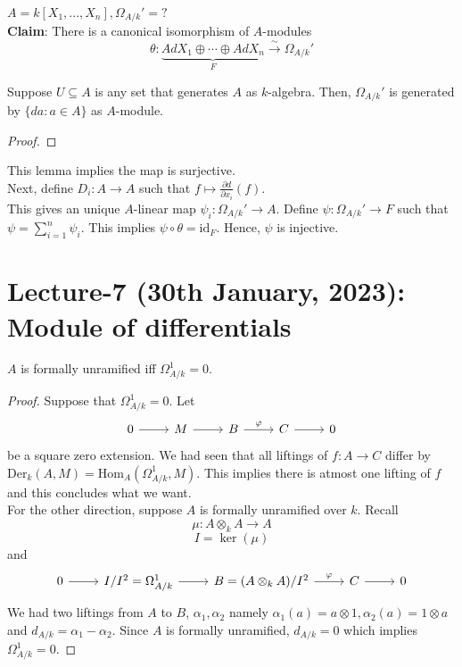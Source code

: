 \documentclass[oneside, 12pt, ]{scrbook}
\newcommand{\Hom}{\mathrm{Hom}}
\newcommand{\ds}{\displaystyle}
\theoremstyle{theorem}
\begin{document}
\begin{exercise}
$A= k[X_{1}, \hdots , X_{n}], \Omega_{A/k}' = ?$ \\
\textbf{Claim}: There is a canonical isomorphism of $A$-modules $$\theta : \underbrace{AdX_{1} \oplus \cdots \oplus AdX_{n}}_{F} \xrightarrow{\sim} \Omega_{A/k}'$$ 
\begin{lemma}
Suppose $U \subseteq A$ is any set that generates $A$ as $k$-algebra. Then, $\Omega_{A/k}'$ is generated by $\{da: a\in A\}$ as $A$-module. 
\end{lemma}
\begin{proof}

\end{proof}
This lemma implies the map is surjective. \\
Next, define $D_{i}: A \rightarrow A$ such that $f \mapsto \ds{\frac{\partial d}{\partial x_{i}}(f)}$. \\
This gives an unique $A$-linear map $\psi_{i}: \Omega_{A/k}' \rightarrow A$. Define $\psi: \Omega_{A/k}' \rightarrow F$ such that $\psi = \sum_{i=1}^n \psi_{i}$. This implies $\psi \circ \theta = \mathrm{id}_{F}$. Hence, $\psi$ is injective. 
\end{exercise}


\chapter{Lecture-7 (30th January, 2023): Module of differentials}

\begin{lemma}
$A$ is formally unramified iff $\Omega_{A/k}^{1} = 0$.
\end{lemma}

\begin{proof}
Suppose that $\Omega_{A/k}^{1} =0$. Let 
\[\begin{tikzcd}
	0 & M & B & C & 0
	\arrow[from=1-1, to=1-2]
	\arrow[from=1-2, to=1-3]
	\arrow["\varphi", from=1-3, to=1-4]
	\arrow[from=1-4, to=1-5]
\end{tikzcd}\] be a square zero extension. We had seen that all liftings of $f: A \rightarrow C$ differ by $\mathrm{Der}_{k}(A,M) = \Hom_{A}(\Omega_{A/k}^{1}, M)$. This implies there is atmost one lifting of $f$ and this concludes what we want. \\

For the other direction, suppose $A$ is formally unramified over $k$. Recall $$\mu: A \otimes_{k} A \rightarrow A$$ $$I = \ker(\mu)$$ and 
\[\begin{tikzcd}
	0 & I/I^2 = \Omega_{A/k}^{1} & B = (A \otimes_{k} A)/I^2 & C & 0
	\arrow[from=1-1, to=1-2]
	\arrow[from=1-2, to=1-3]
	\arrow["\varphi", from=1-3, to=1-4]
	\arrow[from=1-4, to=1-5]
\end{tikzcd}\]
We had two liftings from $A$ to $B$, $\alpha_{1},\alpha_{2}$ namely $\alpha_{1}(a) = a\otimes 1, \alpha_{2}(a) = 1 \otimes a$ and $d_{A/k} = \alpha_{1} - \alpha_{2}$. Since $A$ is formally unramified, $d_{A/k} = 0$ which implies $\Omega_{A/k}^{1} = 0$.
\end{proof}
\end{document}
